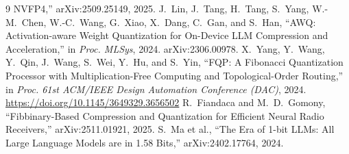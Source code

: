 \documentclass[11pt]{article}
\theoremstyle{definition}
\begin{document}
\begin{thebibliography}{9}
NVFP4,'' arXiv:2509.25149, 2025.
 J.~Lin, J.~Tang, H.~Tang, S.~Yang, W.-M.~Chen, W.-C.~Wang,
G.~Xiao, X.~Dang, C.~Gan, and S.~Han, ``AWQ: Activation-aware Weight
Quantization for On-Device LLM Compression and Acceleration,'' in
\emph{Proc. MLSys}, 2024. arXiv:2306.00978.
 X.~Yang, Y.~Wang, Y.~Qin, J.~Wang, S.~Wei, Y.~Hu, and S.~Yin,
``FQP: A Fibonacci Quantization Processor with Multiplication-Free Computing and
Topological-Order Routing,'' in \emph{Proc. 61st ACM/IEEE Design Automation
Conference (DAC)}, 2024. \url{https://doi.org/10.1145/3649329.3656502}
 R.~Fiandaca and M.~D.~Gomony, ``Fibbinary-Based Compression
and Quantization for Efficient Neural Radio Receivers,'' arXiv:2511.01921, 2025.
 S.~Ma et al., ``The Era of 1-bit LLMs: All Large Language Models are in 1.58 Bits,'' arXiv:2402.17764, 2024.
\end{thebibliography}
\end{document}
